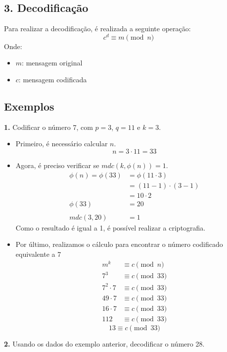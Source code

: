 \subsection*{3. Decodificação}
Para realizar a decodificação, é realizada a seguinte operação:
\[
    c^{d} \equiv m \pmod {n}
\]
Onde:
\begin{itemize}
    \item $m$: mensagem original
    \item $c$: mensagem codificada
\end{itemize}

\subsection*{Exemplos}
\textbf{1.} Codificar o número 7, com $p = 3$, $q = 11$ e $k = 3$.

\begin{itemize}
    \item Primeiro, é necessário calcular $n$.
          \[
              n = 3 \cdot 11 = 33
          \]
    \item Agora, é preciso verificar se $mdc(k, \phi(n)) = 1$.
          \begin{align*}
              \phi(n) = \phi(33) & = \phi(11 \cdot 3)       \\
                                 & = (11 - 1) \cdot (3 - 1) \\
                                 & = 10 \cdot 2             \\
              \phi(33)           & = 20
              \\
              \\
              mdc(3, 20)         & = 1
          \end{align*}
          Como o resultado é igual a 1, é possível realizar a criptografia.
    \item Por último, realizamos o cálculo para encontrar o número codificado equivalente a 7
          \begin{align*}
              m^{k}         & \equiv c \pmod {n}  \\
              7^{3}         & \equiv c \pmod {33} \\
              7^{2} \cdot 7 & \equiv c \pmod {33} \\
              49 \cdot 7    & \equiv c \pmod {33} \\
              16 \cdot 7    & \equiv c \pmod {33} \\
              112           & \equiv c \pmod {33}
          \end{align*}
          \[
              \boxed{
                  13 \equiv c \pmod {33}
              }
          \]
\end{itemize}
\vspace{24pt}
\textbf{2.} Usando os dados do exemplo anterior, decodificar o número 28.

